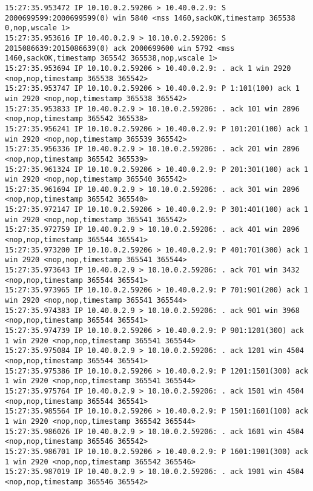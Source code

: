 \documentclass[a4paper,12pt]{article}
\begin{document}
\begin{Verbatim}
15:27:35.953472 IP 10.10.0.2.59206 > 10.40.0.2.9: S 2000699599:2000699599(0) win 5840 <mss 1460,sackOK,timestamp 365538 0,nop,wscale 1>
15:27:35.953616 IP 10.40.0.2.9 > 10.10.0.2.59206: S 2015086639:2015086639(0) ack 2000699600 win 5792 <mss 1460,sackOK,timestamp 365542 365538,nop,wscale 1>
15:27:35.953694 IP 10.10.0.2.59206 > 10.40.0.2.9: . ack 1 win 2920 <nop,nop,timestamp 365538 365542>
15:27:35.953747 IP 10.10.0.2.59206 > 10.40.0.2.9: P 1:101(100) ack 1 win 2920 <nop,nop,timestamp 365538 365542>
15:27:35.953833 IP 10.40.0.2.9 > 10.10.0.2.59206: . ack 101 win 2896 <nop,nop,timestamp 365542 365538>
15:27:35.956241 IP 10.10.0.2.59206 > 10.40.0.2.9: P 101:201(100) ack 1 win 2920 <nop,nop,timestamp 365539 365542>
15:27:35.956336 IP 10.40.0.2.9 > 10.10.0.2.59206: . ack 201 win 2896 <nop,nop,timestamp 365542 365539>
15:27:35.961324 IP 10.10.0.2.59206 > 10.40.0.2.9: P 201:301(100) ack 1 win 2920 <nop,nop,timestamp 365540 365542>
15:27:35.961694 IP 10.40.0.2.9 > 10.10.0.2.59206: . ack 301 win 2896 <nop,nop,timestamp 365542 365540>
15:27:35.972147 IP 10.10.0.2.59206 > 10.40.0.2.9: P 301:401(100) ack 1 win 2920 <nop,nop,timestamp 365541 365542>
15:27:35.972759 IP 10.40.0.2.9 > 10.10.0.2.59206: . ack 401 win 2896 <nop,nop,timestamp 365544 365541>
15:27:35.973200 IP 10.10.0.2.59206 > 10.40.0.2.9: P 401:701(300) ack 1 win 2920 <nop,nop,timestamp 365541 365544>
15:27:35.973643 IP 10.40.0.2.9 > 10.10.0.2.59206: . ack 701 win 3432 <nop,nop,timestamp 365544 365541>
15:27:35.973965 IP 10.10.0.2.59206 > 10.40.0.2.9: P 701:901(200) ack 1 win 2920 <nop,nop,timestamp 365541 365544>
15:27:35.974383 IP 10.40.0.2.9 > 10.10.0.2.59206: . ack 901 win 3968 <nop,nop,timestamp 365544 365541>
15:27:35.974739 IP 10.10.0.2.59206 > 10.40.0.2.9: P 901:1201(300) ack 1 win 2920 <nop,nop,timestamp 365541 365544>
15:27:35.975084 IP 10.40.0.2.9 > 10.10.0.2.59206: . ack 1201 win 4504 <nop,nop,timestamp 365544 365541>
15:27:35.975386 IP 10.10.0.2.59206 > 10.40.0.2.9: P 1201:1501(300) ack 1 win 2920 <nop,nop,timestamp 365541 365544>
15:27:35.975764 IP 10.40.0.2.9 > 10.10.0.2.59206: . ack 1501 win 4504 <nop,nop,timestamp 365544 365541>
15:27:35.985564 IP 10.10.0.2.59206 > 10.40.0.2.9: P 1501:1601(100) ack 1 win 2920 <nop,nop,timestamp 365542 365544>
15:27:35.986026 IP 10.40.0.2.9 > 10.10.0.2.59206: . ack 1601 win 4504 <nop,nop,timestamp 365546 365542>
15:27:35.986701 IP 10.10.0.2.59206 > 10.40.0.2.9: P 1601:1901(300) ack 1 win 2920 <nop,nop,timestamp 365542 365546>
15:27:35.987019 IP 10.40.0.2.9 > 10.10.0.2.59206: . ack 1901 win 4504 <nop,nop,timestamp 365546 365542>

\end{Verbatim}
\end{document}
